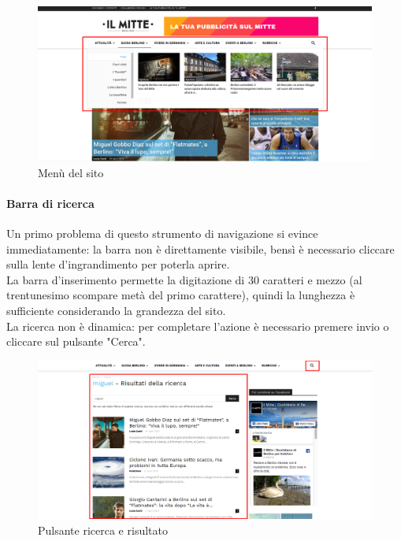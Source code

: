 \vspace{30pt}
\begin{figure}[htbp]
\begin{center}
\includegraphics[width=35em]{img/menu}
\caption{Menù del sito}
\end{center}
\end{figure}
\vspace{30pt}

\paragraph*{Barra di ricerca}

Un primo problema di questo strumento di navigazione si evince immediatamente: la barra non è direttamente visibile, bensì è necessario cliccare sulla lente d'ingrandimento per poterla aprire. \\
La barra d'inserimento permette la digitazione di 30 caratteri e mezzo (al trentunesimo scompare metà del primo carattere), quindi la lunghezza è sufficiente considerando la grandezza del sito. \\
La ricerca non è dinamica: per completare l'azione è necessario premere invio o cliccare sul pulsante "Cerca". 


\vspace{30pt}
\begin{figure}[htbp]
\begin{center}
\includegraphics[width=35em]{img/ricerca}
\caption{Pulsante ricerca e risultato}
\end{center}
\end{figure}
\vspace{30pt}


